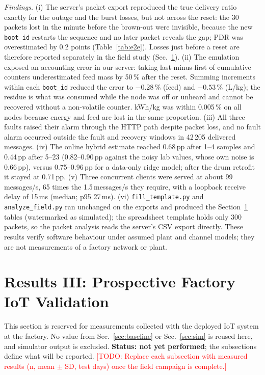 \documentclass[journal]{IEEEtran}
\newcommand{\TODO}[1]{\textcolor{red}{[TODO: #1]}}
\begin{document}
\emph{Findings.} (i) The server's packet export reproduced the true delivery ratio exactly for the outage and the
burst losses, but not across the reset: the 30 packets lost in the minute before the brown-out were invisible,
because the new \texttt{boot\_id} restarts the sequence and no later packet reveals the gap; PDR was overestimated by
0.2 points (Table~\ref{tab:e2e}). Losses just before a reset are therefore reported separately in the field study
(Sec.~\ref{sec:iot}). (ii) The emulation exposed an accounting error in our server: taking last-minus-first of
cumulative counters underestimated feed mass by 50\,\% after the reset. Summing increments within each
\texttt{boot\_id} reduced the error to $-0.28$\,\% (feed) and $-0.53$\,\% (L/kg); the residue is what was consumed while
the node was off or unheard and cannot be recovered without a non-volatile counter. kWh/kg was within 0.005\,\% on all
nodes because energy and feed are lost in the same proportion. (iii) All three faults raised their alarm through
the HTTP path despite packet loss, and no fault alarm occurred outside the fault and recovery windows in 42\,205
delivered messages. (iv) The online hybrid estimate reached 0.68\,pp after 1--4 samples and 0.44\,pp after 5--23
(0.82--0.90\,pp against the noisy lab values, whose own noise is 0.66\,pp), versus 0.75--0.96\,pp for a data-only ridge
model; after the drum retrofit it stayed at 0.71\,pp. (v) Three concurrent clients were served at about
99\,messages/s, 65 times the 1.5\,messages/s they require, with a loopback receive delay of 15\,ms (median; p95
27\,ms). (vi) \texttt{fill\_template.py} and \texttt{analyze\_field.py} ran unchanged on the exports and produced
the Section~\ref{sec:iot} tables (watermarked as simulated); the spreadsheet template holds only 300 packets, so the
packet analysis reads the server's CSV export directly. These results verify software behaviour under assumed
plant and channel models; they are not measurements of a factory network or plant.

\section{Results III: Prospective Factory IoT Validation}
\label{sec:iot}
This section is reserved for measurements collected with the deployed IoT system at the factory. No value from
Sec.~\ref{sec:baseline} or Sec.~\ref{sec:sim} is reused here, and simulator output is excluded. \textbf{Status: not yet performed}; the
subsections define what will be reported.
\TODO{Replace each subsection with measured results (n, mean $\pm$ SD, test days) once the field campaign is complete.}
\end{document}
